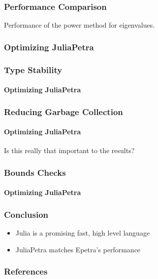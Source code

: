 \documentclass[14pt]{beamer}
\begin{document}
\begin{frame}
	\frametitle{Performance Comparison}
	\nocite{Github:DA,Gu:2000:PowerMethod}
	\centering
	
	Performance of the power method for eigenvalues.
\end{frame}
\begin{frame}
	\frametitle{Optimizing JuliaPetra}
\end{frame}
\begin{frame}
	\frametitle{Type Stability}
	\framesubtitle{Optimizing JuliaPetra}
\end{frame}
\begin{frame}
	\frametitle{Reducing Garbage Collection}
	\framesubtitle{Optimizing JuliaPetra}
	
	Is this really that important to the results?
\end{frame}
\begin{frame}
	\frametitle{Bounds Checks}
	\framesubtitle{Optimizing JuliaPetra}
\end{frame}
\begin{frame}
	\frametitle{Conclusion}
	\begin{itemize}
		\item Julia is a promising fast, high level language
		\item JuliaPetra matches Epetra's performance
	\end{itemize}
\end{frame}
\begin{frame}[allowframebreaks]
	\frametitle{References}




\end{frame}
\end{document}
